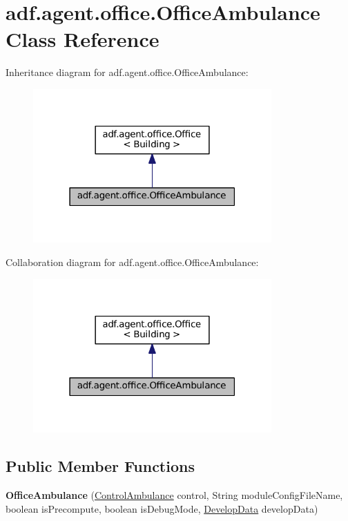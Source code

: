 \hypertarget{classadf_1_1agent_1_1office_1_1OfficeAmbulance}{}\section{adf.\+agent.\+office.\+Office\+Ambulance Class Reference}
\label{classadf_1_1agent_1_1office_1_1OfficeAmbulance}


Inheritance diagram for adf.\+agent.\+office.\+Office\+Ambulance\+:
\nopagebreak
\begin{figure}[H]
\begin{center}
\leavevmode
\includegraphics[width=259pt]{classadf_1_1agent_1_1office_1_1OfficeAmbulance__inherit__graph}
\end{center}
\end{figure}


Collaboration diagram for adf.\+agent.\+office.\+Office\+Ambulance\+:
\nopagebreak
\begin{figure}[H]
\begin{center}
\leavevmode
\includegraphics[width=259pt]{classadf_1_1agent_1_1office_1_1OfficeAmbulance__coll__graph}
\end{center}
\end{figure}
\subsection*{Public Member Functions}
\begin{DoxyCompactItemize}
\item 
\hypertarget{classadf_1_1agent_1_1office_1_1OfficeAmbulance_a3b7c03ca26a66f374368ef1dcc2f5f56}{}\label{classadf_1_1agent_1_1office_1_1OfficeAmbulance_a3b7c03ca26a66f374368ef1dcc2f5f56} 
{\bfseries Office\+Ambulance} (\hyperlink{classadf_1_1component_1_1control_1_1ControlAmbulance}{Control\+Ambulance} control, String module\+Config\+File\+Name, boolean is\+Precompute, boolean is\+Debug\+Mode, \hyperlink{classadf_1_1agent_1_1develop_1_1DevelopData}{Develop\+Data} develop\+Data)
\end{DoxyCompactItemize}
